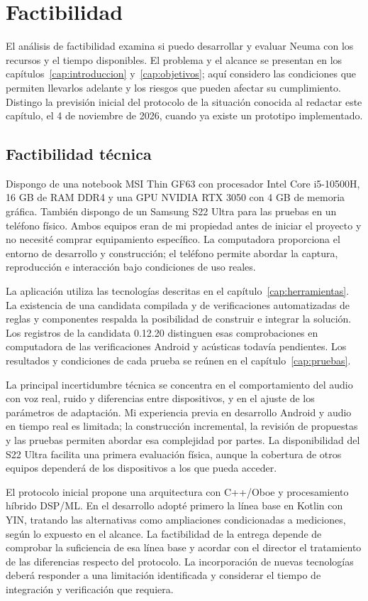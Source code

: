 \chapter{Factibilidad}
\label{cap:factibilidad}
El análisis de factibilidad examina si puedo desarrollar y evaluar Neuma con los
recursos y el tiempo disponibles. El problema y el alcance se presentan en los
capítulos~\ref{cap:introduccion} y~\ref{cap:objetivos}; aquí considero las
condiciones que permiten llevarlos adelante y los riesgos que pueden afectar
su cumplimiento. Distingo la previsión inicial del protocolo de la situación
conocida al redactar este capítulo, el 4 de noviembre de 2026, cuando ya existe
un prototipo implementado.

\section{Factibilidad técnica}
Dispongo de una notebook MSI Thin GF63 con procesador Intel Core i5-10500H,
16 GB de RAM DDR4 y una GPU NVIDIA RTX 3050 con 4 GB de memoria gráfica.
También dispongo de un Samsung S22 Ultra para las pruebas en un teléfono físico.
Ambos equipos eran de mi propiedad antes de iniciar el proyecto y no necesité
comprar equipamiento específico. La computadora proporciona el entorno de
desarrollo y construcción; el teléfono permite abordar la captura, reproducción
e interacción bajo condiciones de uso reales.

La aplicación utiliza las tecnologías descritas en el capítulo~\ref{cap:herramientas}.
La existencia de una candidata compilada y de verificaciones automatizadas de
reglas y componentes respalda la posibilidad de construir e integrar la solución.
Los registros de la candidata 0.12.20 distinguen esas comprobaciones en computadora
de las verificaciones Android y acústicas todavía pendientes. Los resultados y
condiciones de cada prueba se reúnen en el capítulo~\ref{cap:pruebas}.

La principal incertidumbre técnica se concentra en el comportamiento del audio
con voz real, ruido y diferencias entre dispositivos, y en el ajuste de los
parámetros de adaptación. Mi experiencia previa en desarrollo Android y audio
en tiempo real es limitada; la construcción incremental, la revisión de propuestas
y las pruebas permiten abordar esa complejidad por partes. La disponibilidad
del S22 Ultra facilita una primera evaluación física, aunque la cobertura de
otros equipos dependerá de los dispositivos a los que pueda acceder.

El protocolo inicial propone una arquitectura con C++/Oboe y procesamiento
híbrido DSP/ML. En el desarrollo adopté primero la línea base en Kotlin con YIN,
tratando las alternativas como ampliaciones condicionadas a mediciones, según
lo expuesto en el alcance. La factibilidad de la entrega depende de comprobar
la suficiencia de esa línea base y acordar con el director el tratamiento de
las diferencias respecto del protocolo. La incorporación de nuevas tecnologías
deberá responder a una limitación identificada y considerar el tiempo de
integración y verificación que requiera.

